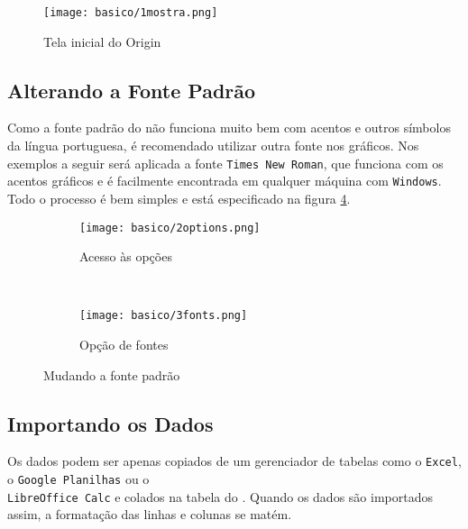 \begin{figure}[H]
    \centering
    \texttt{[image: basico/1mostra.png]}

    \caption{Tela inicial do Origin}
    \label{fig:basico:mostragem}
\end{figure}

\subsection{Alterando a Fonte Padrão}

    Como a fonte padrão do \software não funciona muito bem com acentos e outros símbolos da língua portuguesa, é recomendado utilizar outra fonte nos gráficos. Nos exemplos a seguir será aplicada a fonte \texttt{Times New Roman}, que funciona com os acentos gráficos e é facilmente encontrada em qualquer máquina com \texttt{Windows}. Todo o processo é bem simples e está especificado na figura \ref{fig:basico:mudar_fontes}.

    \begin{figure}[htbp]
        \centering
        \begin{subfigure}{0.45\textwidth}
            \centering
            \texttt{[image: basico/2options.png]}

            \caption{Acesso às opções}
            \label{fig:basico:options}
        \end{subfigure}
        ~
        \begin{subfigure}{0.45\textwidth}
            \centering
            \texttt{[image: basico/3fonts.png]}

            \caption{Opção de fontes}
            \label{fig:basico:fontes}
        \end{subfigure}
        \caption{Mudando a fonte padrão}
        \label{fig:basico:mudar_fontes}
    \end{figure}


\subsection{Importando os Dados}

    Os dados podem ser apenas copiados de um gerenciador de tabelas como o \texttt{Excel}, o \texttt{Google Planilhas} ou o \\\texttt{LibreOffice Calc} e colados na tabela do \software. Quando os dados são importados assim, a formatação das linhas e colunas se matém.

